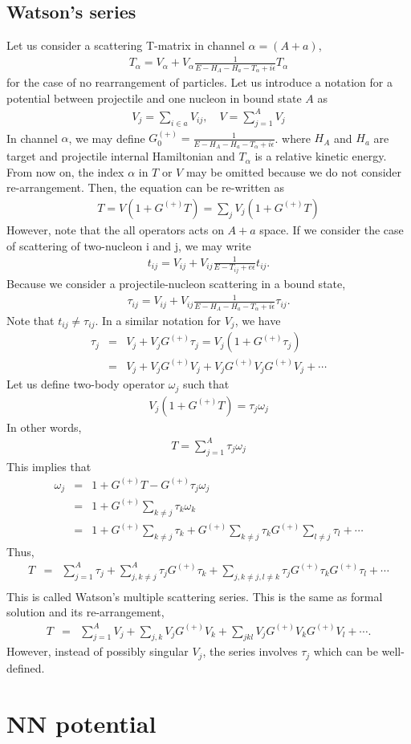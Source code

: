 \documentclass[10pt]{book}
\newcommand{\bea}{\begin{eqnarray}}
\newcommand{\eea}{\end{eqnarray}}
\newcommand{\no}{\nonumber \\}
\begin{document}
\section{Watson's series}
Let us consider a scattering T-matrix in channel $\alpha=(A+a)$,
\bea 
T_\alpha=V_{\alpha}+V_\alpha \frac{1}{E-H_A-H_a-T_\alpha+i\epsilon} T_\alpha 
\eea 
for the case of no rearrangement of particles. 
Let us introduce a notation for a potential between projectile and one nucleon in
bound state $A$ as
\bea 
V_j= \sum_{i\in a} V_{ij}, \quad V=\sum_{j=1}^A V_j
\eea 
In channel $\alpha$, we may define $G^{(+)}_0=\frac{1}{E-H_A-H_a-T_\alpha+i\epsilon}$. 
where $H_A$ and $H_a$ are target and projectile internal Hamiltonian and
$T_\alpha$ is a relative kinetic energy. 
From now on, the index $\alpha$ in $T$ or $V$ may be omitted because we 
do not consider re-arrangement.
Then, the equation can be re-written as
\bea 
T=V(1+G^{(+)}T)=\sum_{j} V_j(1+G^{(+)} T)
\eea 
However, note that the all operators acts on $A+a$ space. 
If we consider the case of scattering of two-nucleon i and j, we may write
\bea 
t_{ij}=V_{ij}+V_{ij}\frac{1}{E-T_{ij}+e\epsilon} t_{ij}.
\eea 
Because we consider a projectile-nucleon scattering in a bound state,
\bea 
\tau_{ij}=V_{ij}+V_{ij}\frac{1}{E-H_A-H_a-T_\alpha+i\epsilon} \tau_{ij}.
\eea 
Note that $t_{ij}\neq \tau_{ij}$.
In a similar notation for $V_j$, we have
\bea 
\tau_j&=&V_j+V_j G^{(+)}\tau_j=V_j(1+G^{(+)}\tau_j) \no 
      &=&V_j+V_j G^{(+)} V_j+V_j G^{(+)} V_j G^{(+)} V_j+\cdots 
\eea 
Let us define two-body operator $\omega_j$ such that
\bea 
V_j(1+G^{(+)} T)=\tau_j \omega_j
\eea 
In other words,
\bea 
T=\sum_{j=1}^A \tau_j\omega_j
\eea 
This implies that
\bea 
\omega_j&=&1+G^{(+)}T-G^{(+)}\tau_j\omega_j \no 
        &=& 1+ G^{(+)}\sum_{k\neq j}\tau_k\omega_k \no 
        &=& 1+G^{(+)}\sum_{k\neq j}\tau_k+G^{(+)}\sum_{k\neq j}\tau_kG^{(+)}\sum_{l\neq j}\tau_l
        +\cdots 
\eea 
Thus,
\bea 
T&=&\sum_{j=1}^A \tau_j +\sum_{j,k\neq j}^A \tau_j G^{(+)}\tau_k
              +\sum_{j,k\neq j,l\neq k}\tau_j G^{(+)}\tau_k G^{(+)}\tau_l+\cdots \no               
\eea 
This is called Watson's multiple scattering series.
This  is the same as formal solution and its re-arrangement, 
\bea 
T&=&\sum_{j=1}^A V_j +\sum_{j,k} V_j G^{(+)} V_k+\sum_{jkl} V_j G^{(+)}V_k G^{(+)}V_l 
  +\cdots .
\eea 
However, instead of possibly singular $V_j$, the series involves $\tau_j$
which can be well-defined. 



\chapter{NN potential}
\end{document}
